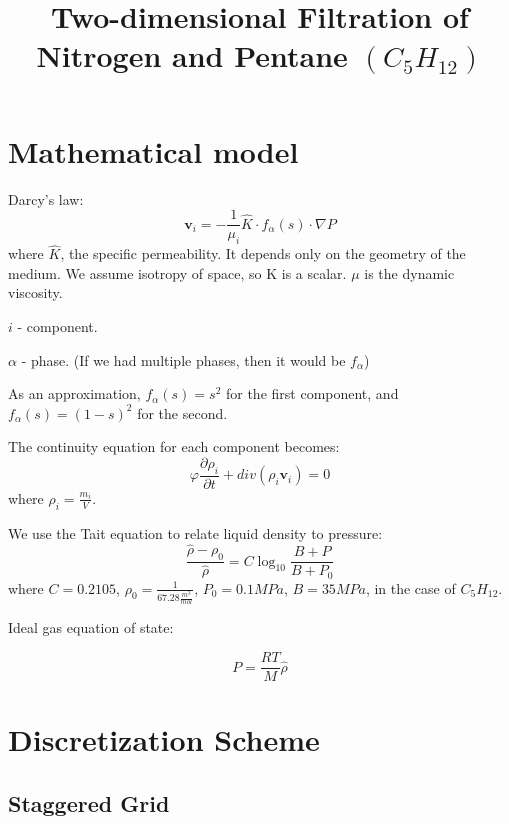 \documentclass[a4paper,12pt]{article}
\author{}
\date{}
\title{Two-dimensional Filtration of Nitrogen and Pentane
\(\left( C_5 H_{12} \right) \)}
\begin{document}
\maketitle

\section{Mathematical model}

Darcy's law:
\begin{equation}
    \bm{v}_i = -\frac{1}{\mu_i} \hat K \cdot f_\alpha (s)
    \cdot \nabla P
\end{equation}
where \(\hat K\), the specific permeability.
It depends only on the geometry of the medium.
We assume isotropy of space, so K is a scalar.
\(\mu\) is the dynamic viscosity.

\(i\) - component.

\(\alpha\) - phase. (If we had multiple phases, then
it would be \(f_\alpha\))

As an approximation, \(f_\alpha (s) = s^2\) for the first 
component, and \(f_\alpha (s) = (1 - s)^2\) for the second.

The continuity equation for each component becomes:
\begin{equation}
    \varphi \frac{\partial \rho_i}{\partial t}
    + div (\rho_i \bm{v}_i) = 0
\end{equation}
where \(\rho_i = \frac{m_i}{V}\).

We use the Tait equation to relate liquid density to pressure:
\begin{equation}
    \frac{\hat{\rho} - \rho_0}{\hat{\rho}} = C \log_{10}
    \frac{B + P}{B + P_0}
\end{equation}
where \(C = 0.2105\),
\(\rho_0 = \frac{1}{67.28 \frac{m^3}{mol}}\),
\(P_0 = 0.1 MPa\), \(B = 35MPa\),
in the case of \(C_5H_{12}\).

Ideal gas equation of state:

\begin{equation}
    P = \frac{RT}{M} \hat{\rho}
\end{equation}
\section{Discretization Scheme}

\subsection{Staggered Grid}
\end{document}
